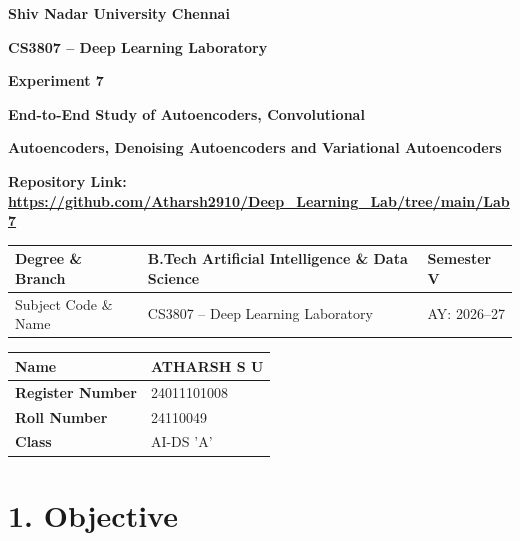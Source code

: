 \documentclass[10pt]{article}
\begin{document}

\begin{center}

{\large\textbf{Shiv Nadar University Chennai}}

\vspace{2mm}

{\normalsize\textbf{CS3807 -- Deep Learning Laboratory}}

\vspace{2mm}

{\large\textbf{Experiment 7}}

\vspace{1mm}

{\normalsize\textbf{End-to-End Study of Autoencoders, Convolutional}}

{\normalsize\textbf{Autoencoders, Denoising Autoencoders and Variational Autoencoders}}

\end{center}


\textbf{Repository Link:}
\textbf{\url{https://github.com/Atharsh2910/Deep_Learning_Lab/tree/main/Lab7}
}


\vspace{3mm}

\begin{tabular}{|p{3.8cm}|p{8cm}|p{2cm}|}
\hline
Degree \& Branch & B.Tech Artificial Intelligence \& Data Science & Semester V\\ \hline
Subject Code \& Name & CS3807 -- Deep Learning Laboratory & AY: 2026--27\\ \hline
\end{tabular}

\begin{tabular}{|p{3.5cm}|p{8cm}|}
\hline
\textbf{Name} & {ATHARSH S U}\\ \hline
\textbf{Register Number} &{24011101008} \\ \hline
\textbf{Roll Number} &{24110049} \\ \hline
\textbf{Class} & {AI-DS 'A'}\\ \hline
\end{tabular}
\vspace{3mm}

\section*{1. Objective}
\end{document}
